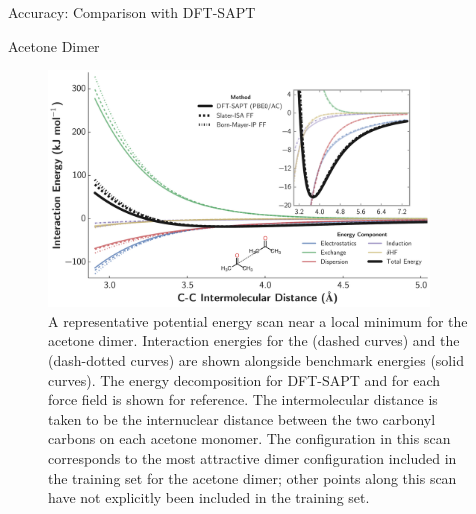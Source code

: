 \begin{subsection}{Accuracy: Comparison with DFT-SAPT}
\begin{subsubsection}{Acetone Dimer}
    \begin{figure}
    \includegraphics[width=0.9\textwidth]{isotropic/acetone_acetone_pes.pdf}
    \caption{
      A representative potential energy scan near a local minimum for the
      acetone dimer.  Interaction energies for the \isaffold (dashed curves) and
      the \saptff
      (dash-dotted curves) are shown alongside benchmark \saptpbeo energies (solid
      curves). The energy decomposition for DFT-SAPT and for each force field is
      shown for reference.  The intermolecular distance is taken to be the
      internuclear distance between the two carbonyl carbons on each acetone
      monomer.  The configuration in this scan corresponds to the
      most attractive dimer configuration included in the training set for the acetone dimer;
      other points along this scan have not explicitly been included in the training
      set.
      }
    \label{fig:isotropic-acetone-pes}
    \end{figure}


\end{subsubsection}
\end{subsection}
